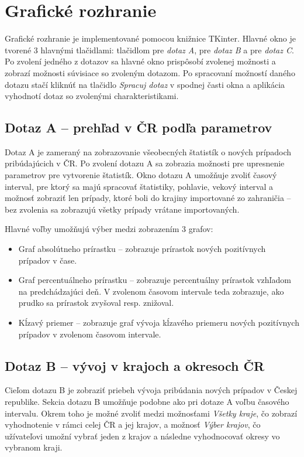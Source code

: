 \documentclass [11pt, a4paper]{article}
\begin{document}
\section*{Grafické rozhranie}
Grafické rozhranie je implementované pomocou knižnice TKinter. Hlavné okno je tvorené 3 hlavnými tlačidlami: tlačidlom pre \textit{dotaz A}, pre \textit{dotaz B} a pre \textit{dotaz C}. Po zvolení jedného z dotazov sa hlavné okno prispôsobí zvolenej možnosti a zobrazí možnosti súvisiace so zvoleným dotazom. Po spracovaní možností daného dotazu stačí kliknúť na tlačidlo \textit{Spracuj dotaz} v spodnej časti okna a aplikácia vyhodnotí dotaz so zvolenými charakteristikami.

\subsection*{Dotaz A -- prehľad v ČR podľa parametrov}
Dotaz A je zameraný na zobrazovanie všeobecných štatistík o nových prípadoch pribúdajúcich v ČR.
Po zvolení dotazu A sa zobrazia možnosti pre upresnenie parametrov pre vytvorenie štatistík. 
Okno dotazu A umožňuje zvoliť časový interval, pre ktorý sa majú spracovať štatistiky, pohlavie, vekový interval a možnosť zobraziť len prípady, ktoré boli do krajiny importované zo zahraničia -- bez zvolenia sa zobrazujú všetky prípady vrátane importovaných.

Hlavné voľby umožňujú výber medzi zobrazením 3 grafov:
\begin{itemize}
    \item Graf absolútneho prírastku -- zobrazuje prírastok nových pozitívnych prípadov v čase.
    \item Graf percentuálneho prírastku -- zobrazuje percentuálny prírastok vzhľadom na predchádzajúci deň. V zvolenom časovom intervale teda zobrazuje, ako prudko sa prírastok zvyšoval resp. znižoval.
    \item Kĺzavý priemer -- zobrazuje graf vývoja kĺzavého priemeru nových pozitívnych prípadov v zvolenom časovom intervale.
\end{itemize}

\subsection*{Dotaz B -- vývoj v krajoch a okresoch ČR}
Cieľom dotazu B je zobraziť priebeh vývoja pribúdania nových prípadov v Českej republike.
Sekcia dotazu B umožňuje podobne ako pri dotaze A voľbu časového intervalu. Okrem toho je možné zvoliť medzi možnosťami \textit{Všetky kraje}, čo zobrazí vyhodnotenie v rámci celej ČR a jej krajov, a možnosť \textit{Výber krajov}, čo užívateľovi umožní vybrať jeden z krajov a následne vyhodnocovať okresy vo vybranom kraji.
\end{document}
